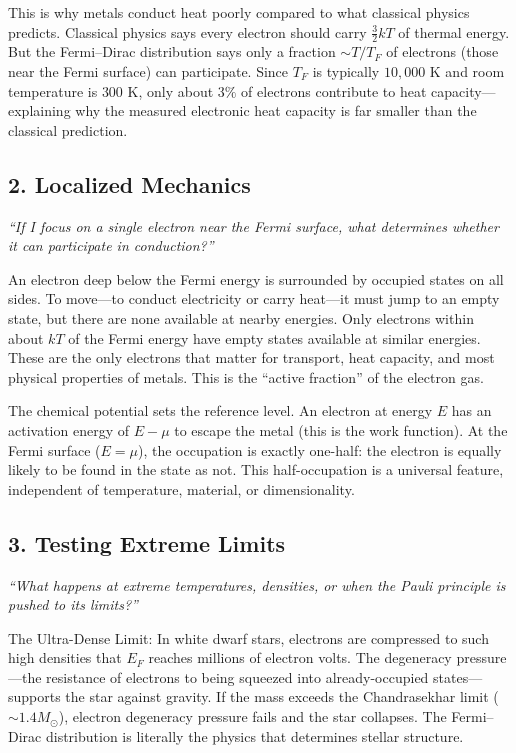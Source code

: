 This is why metals conduct heat poorly compared to what classical physics predicts. Classical physics says every electron should carry $\frac{3}{2}kT$ of thermal energy. But the Fermi--Dirac distribution says only a fraction $\sim T/T_F$ of electrons (those near the Fermi surface) can participate. Since $T_F$ is typically $10{,}000$ K and room temperature is $300$ K, only about $3\%$ of electrons contribute to heat capacity---explaining why the measured electronic heat capacity is far smaller than the classical prediction.

\subsection*{2. Localized Mechanics}
\textit{``If I focus on a single electron near the Fermi surface, what determines whether it can participate in conduction?''}

An electron deep below the Fermi energy is surrounded by occupied states on all sides. To move---to conduct electricity or carry heat---it must jump to an empty state, but there are none available at nearby energies. Only electrons within about $kT$ of the Fermi energy have empty states available at similar energies. These are the only electrons that matter for transport, heat capacity, and most physical properties of metals. This is the ``active fraction'' of the electron gas.

The chemical potential sets the reference level. An electron at energy $E$ has an activation energy of $E - \mu$ to escape the metal (this is the work function). At the Fermi surface ($E = \mu$), the occupation is exactly one-half: the electron is equally likely to be found in the state as not. This half-occupation is a universal feature, independent of temperature, material, or dimensionality.

\subsection*{3. Testing Extreme Limits}
\textit{``What happens at extreme temperatures, densities, or when the Pauli principle is pushed to its limits?''}

The Ultra-Dense Limit: In white dwarf stars, electrons are compressed to such high densities that $E_F$ reaches millions of electron volts. The degeneracy pressure---the resistance of electrons to being squeezed into already-occupied states---supports the star against gravity. If the mass exceeds the Chandrasekhar limit ($\sim 1.4 M_\odot$), electron degeneracy pressure fails and the star collapses. The Fermi--Dirac distribution is literally the physics that determines stellar structure.

